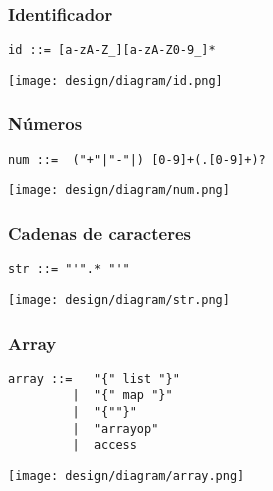 \pagebreak
\subsubsection{Identificador}
\begin{multicols}{2}
\begin{lstlisting}[style=nonumbers]      
id ::= [a-zA-Z_][a-zA-Z0-9_]*
\end{lstlisting}  
\columnbreak	
\begin{center}
\texttt{[image: design/diagram/id.png]} 
\end{center}
\end{multicols}

\subsubsection{Números}
\begin{multicols}{2}
\begin{lstlisting}[style=nonumbers]      
num ::=  ("+"|"-"|) [0-9]+(.[0-9]+)?
\end{lstlisting}  
\columnbreak	
\begin{center}
\texttt{[image: design/diagram/num.png]} 
\end{center}
\end{multicols}
\subsubsection{Cadenas de caracteres}
\begin{multicols}{2}
\begin{lstlisting}[style=nonumbers]      
str ::= "'".* "'"
\end{lstlisting}  
\columnbreak	
\begin{center}
\texttt{[image: design/diagram/str.png]} 
\end{center}
\end{multicols}

\subsubsection{Array}
\begin{multicols}{2}
\begin{lstlisting}[style=nonumbers]      
array ::=   "{" list "}"
         |  "{" map "}"
         |  "{""}"
         |  "arrayop"
         |  access
\end{lstlisting}  
\columnbreak	
\begin{center}
\texttt{[image: design/diagram/array.png]} 
\end{center}
\end{multicols}
\pagebreak

